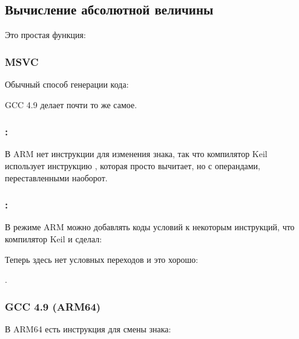 \subsection{Вычисление абсолютной величины}
\label{sec:abs}

Это простая функция:



\subsubsection{\Optimizing MSVC}

Обычный способ генерации кода:



GCC 4.9 делает почти то же самое.

\subsubsection{\OptimizingKeilVI: \ThumbMode}



В ARM нет инструкции для изменения знака, так что компилятор Keil использует инструкцию ,
которая просто вычитает, но с операндами, переставленными наоборот.

\subsubsection{\OptimizingKeilVI: \ARMMode}

В режиме ARM можно добавлять коды условий к некоторым инструкций, что компилятор Keil и сделал:



Теперь здесь нет условных переходов и это хорошо:
 
.

\subsubsection{\NonOptimizing GCC 4.9 (ARM64)}

В ARM64 есть инструкция  для смены знака:

